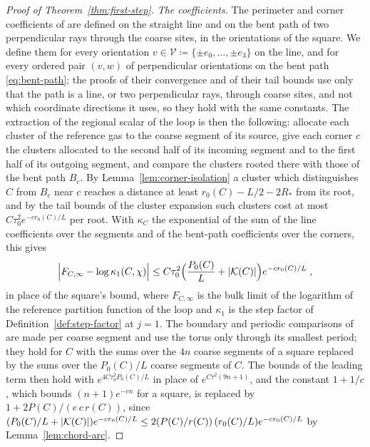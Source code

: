 \documentclass[11pt]{preprint}
\DeclarePairedDelimiter{\abs}{\lvert}{\rvert}
\numberwithin{equation}{section}
\theoremstyle{definition}
\theoremstyle{remark}
\theoremstyle{plain}
\begin{document}
\begin{proof}[Proof of Theorem~\ref{thm:first-step}]
\emph{The coefficients.} The perimeter and corner coefficients of \cite[Sections~5--6]{WilsonFirstStep} are defined on the straight line and on the bent path of two perpendicular rays through the coarse sites, in the orientations of the square. We define them for every orientation $v \in \mathcal V \coloneqq \{ \pm e_0, \dots, \pm e_3 \}$ on the line, and for every ordered pair $(v, w)$ of perpendicular orientations on the bent path \eqref{eq:bent-path}; the proofs of their convergence and of their tail bounds use only that the path is a line, or two perpendicular rays, through coarse sites, and not which coordinate directions it uses, so they hold with the same constants. The extraction of the regional scalar of the loop is then the following: allocate each cluster of the reference gas to the coarse segment of its source, give each corner $c$ the clusters allocated to the second half of its incoming segment and to the first half of its outgoing segment, and compare the clusters rooted there with those of the bent path $B_c$. By Lemma~\ref{lem:corner-isolation} a cluster which distinguishes $C$ from $B_c$ near $c$ reaches a distance at least $r_0(C) - L/2 - 2R_*$ from its root, and by the tail bounds of the cluster expansion such clusters cost at most $C\tau_0^2e^{-cr_0(C)/L}$ per root. With $\kappa_C$ the exponential of the sum of the line coefficients over the segments and of the bent-path coefficients over the corners, this gives
\begin{equation}\label{eq:first-step-extraction}
    \Bigl\lvert F_{C,\infty} - \log\kappa_1(C, \chi)\Bigr\rvert \leq C\tau_0^2\Bigl(\frac{P_0(C)}{L} + \abs{\mathcal K(C)}\Bigr)e^{-cr_0(C)/L}\;,
\end{equation}
in place of the square's bound, where $F_{C,\infty}$ is the bulk limit of the logarithm of the reference partition function of the loop and $\kappa_1$ is the step factor of Definition~\ref{def:step-factor} at $j = 1$. The boundary and periodic comparisons of \cite[Section~7 and Appendix~F]{WilsonFirstStep} are made per coarse segment and use the torus only through its smallest period; they hold for $C$ with the sums over the $4n$ coarse segments of a square replaced by the sums over the $P_0(C)/L$ coarse segments of $C$. The bounds of the leading term then hold with $e^{4C\tau_0^2P_0(C)/L}$ in place of $e^{C\tau^2(9n + 1)}$, and the constant $1 + 1/c$, which bounds $(n + 1)e^{-cn}$ for a square, is replaced by $1 + 2P(C)/(e\,c\,r(C))$, since $(P_0(C)/L + \abs{\mathcal K(C)})e^{-cr_0(C)/L} \leq 2(P(C)/r(C))\,(r_0(C)/L)e^{-cr_0(C)/L}$ by Lemma~\ref{lem:chord-arc}.


\end{proof}
\end{document}
